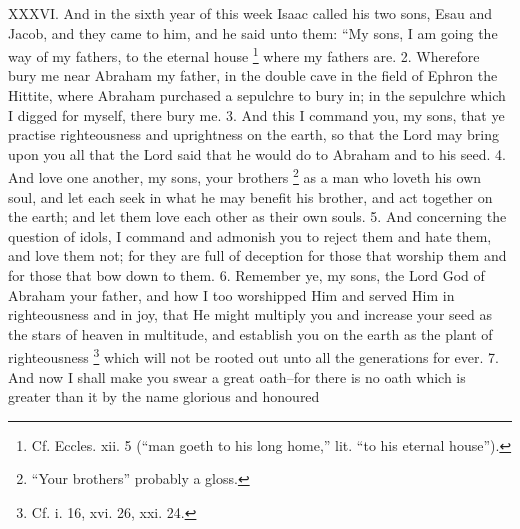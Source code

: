 XXXVI. And in the sixth year of this week Isaac called his two sons, Esau and Jacob, and they came to him, and he said unto them: ``My sons, I am going the way of my fathers, to the eternal house \footnote{Cf. Eccles. xii. 5 (``man goeth to his long home,'' lit. ``to his eternal house'').} where my fathers are. 2. Wherefore bury me near Abraham my father, in the double cave in the field of Ephron the Hittite, where Abraham purchased a sepulchre to bury in; in the sepulchre which I digged for myself, there bury me. 3. And this I command you, my sons, that ye practise righteousness and uprightness on the earth, so that the Lord may bring upon you all that the Lord said that he would do to Abraham and to his seed. 4. And love one another, my sons, your brothers \footnote{``Your brothers'' probably a gloss.} as a man who loveth his own soul, and let each seek in what he may benefit his brother, and act together on the earth; and let them love each other as their own souls. 5. And concerning the question of idols, I command and admonish you to reject them and hate them, and love them not; for they are full of deception for those that worship them and for those that bow down to them. 6. Remember ye, my sons, the Lord God of Abraham your father, and how I too worshipped Him and served Him in righteousness and in joy, that He might multiply you and increase your seed as the stars of heaven in multitude, and establish you on the earth as the plant of righteousness \footnote{Cf. i. 16, xvi. 26, xxi. 24.} which will not be rooted out unto all the generations for ever. 7. And now I shall make you swear a great oath--for there is no oath which is greater than it by the name glorious and honoured

